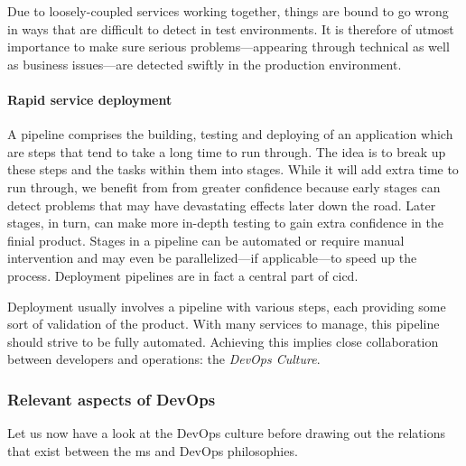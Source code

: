 Due to loosely-coupled services working together, things
are bound to go wrong in ways that are difficult to detect in test
environments. It is therefore of utmost importance to make sure
serious problems---appearing through technical as well as business
issues---are detected swiftly in the production environment. \cite{ms-prereq}


\paragraph{Rapid service deployment}

A pipeline comprises the building, testing and deploying of an
application which are steps that tend to take a long time to run
through. The idea is to break up these steps and the tasks within them
into stages. While it will add extra time to run through, we benefit
from from greater confidence because early stages can detect problems
that may have devastating effects later down the road. Later stages,
in turn, can make more in-depth testing to gain extra confidence in
the finial product. Stages in a pipeline can be automated or require
manual intervention and may even be parallelized---if applicable---to
speed up the process. Deployment pipelines are in fact a central part
of \gls{cicd}. \cite{pipelines}

Deployment usually involves a pipeline with various steps, each
providing some sort of validation of the product.  With many services
to manage, this pipeline should strive to be fully automated.
Achieving this implies close collaboration between
developers and operations: the \textit{DevOps Culture}. \cite{ms-prereq} 

\subsubsection{Relevant aspects of DevOps}

Let us now have a look at the DevOps culture before drawing out the
relations that exist between the \gls{ms} and DevOps philosophies.

